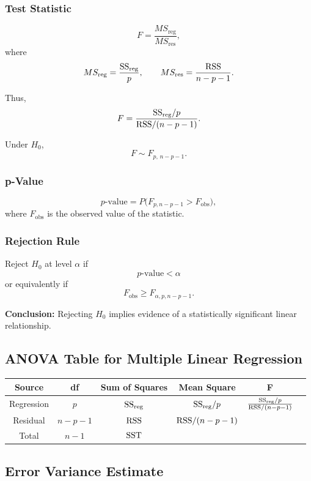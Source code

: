 \subsubsection{Test Statistic}

\[
F = \frac{MS_{\text{reg}}}{MS_{\text{res}}},
\]
where
\[
MS_{\text{reg}} = \frac{\mathrm{SS}_{\mathrm{reg}}}{p}, \qquad
MS_{\text{res}} = \frac{\mathrm{RSS}}{n - p - 1}.
\]

Thus,
\[
F = \frac{\mathrm{SS}_{\mathrm{reg}}/p}{\mathrm{RSS}/(n-p-1)}.
\]

Under $H_0$,
\[
F \sim F_{p,\,n-p-1}.
\]

\subsubsection{p-Value}

\[
p\text{-value} = P\big(F_{p,n-p-1} > F_{\text{obs}}\big),
\]
where $F_{\text{obs}}$ is the observed value of the statistic.

\subsubsection{Rejection Rule}

Reject $H_0$ at level $\alpha$ if
\[
p\text{-value} < \alpha
\]
or equivalently if
\[
F_{\text{obs}} \ge F_{\alpha,p,n-p-1}.
\]

\textbf{Conclusion:} Rejecting $H_0$ implies evidence of a statistically significant linear relationship.

\subsection{ANOVA Table for Multiple Linear Regression}

\begin{center}
\begin{tabular}{cccccc}
\hline
Source & df & Sum of Squares & Mean Square & F \\
\hline
Regression & $p$ & $\mathrm{SS}_{\mathrm{reg}}$ & $\mathrm{SS}_{\mathrm{reg}}/p$ & $\frac{\mathrm{SS}_{\mathrm{reg}}/p}{\mathrm{RSS}/(n-p-1)}$ \\
Residual & $n-p-1$ & $\mathrm{RSS}$ & $\mathrm{RSS}/(n-p-1)$ & \\
Total & $n-1$ & $\mathrm{SST}$ & & \\
\hline
\end{tabular}
\end{center}

\subsection{Error Variance Estimate}


